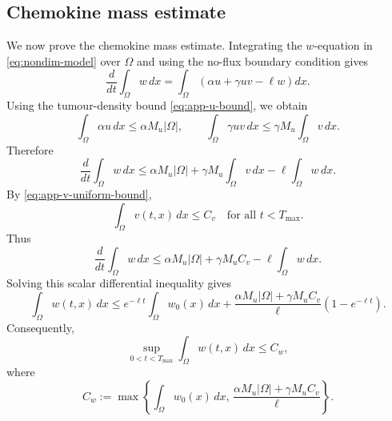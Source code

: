 \documentclass[a4paper,fleqn,longmktitle]{cas-sc}
\theoremstyle{plain}
\theoremstyle{definition}
\numberwithin{equation}{section}
\begin{document}
\subsection{Chemokine mass estimate}
\label{app:w-mass}
We now prove the chemokine mass estimate. Integrating the $w$-equation in
\eqref{eq:nondim-model} over $\Omega$ and using the no-flux boundary condition
gives
\[
\frac{d}{dt}\int_\Omega w\,dx
=
\int_\Omega
\left(
\alpha u+\gamma uv-\ell w
\right)dx.
\]
Using the tumour-density bound \eqref{eq:app-u-bound}, we obtain
\[
\int_\Omega \alpha u\,dx
\le
\alpha M_u|\Omega|,
\qquad
\int_\Omega \gamma uv\,dx
\le
\gamma M_u\int_\Omega v\,dx.
\]
Therefore
\begin{equation}\label{eq:app-w-differential}
\frac{d}{dt}\int_\Omega w\,dx
\le
\alpha M_u|\Omega|
+
\gamma M_u\int_\Omega v\,dx
-
\ell\int_\Omega w\,dx.
\end{equation}
By \eqref{eq:app-v-uniform-bound},
\[
\int_\Omega v(t,x)\,dx\le C_v
\quad\text{for all }t<T_{\max}.
\]
Thus
\[
\frac{d}{dt}\int_\Omega w\,dx
\le
\alpha M_u|\Omega|+\gamma M_u C_v
-\ell\int_\Omega w\,dx.
\]
Solving this scalar differential inequality gives
\begin{equation}\label{eq:app-w-bound}
\int_\Omega w(t,x)\,dx
\le
e^{-\ell t}\int_\Omega w_0(x)\,dx
+
\frac{\alpha M_u|\Omega|+\gamma M_u C_v}{\ell}
\left(1-e^{-\ell t}\right).
\end{equation}
Consequently,
\begin{equation}\label{eq:app-w-uniform-bound}
\sup_{0<t<T_{\max}}\int_\Omega w(t,x)\,dx
\le
C_w,
\end{equation}
where
\[
C_w
:=
\max\left\{
\int_\Omega w_0(x)\,dx,\,
\frac{\alpha M_u|\Omega|+\gamma M_u C_v}{\ell}
\right\}.
\]
\end{document}
